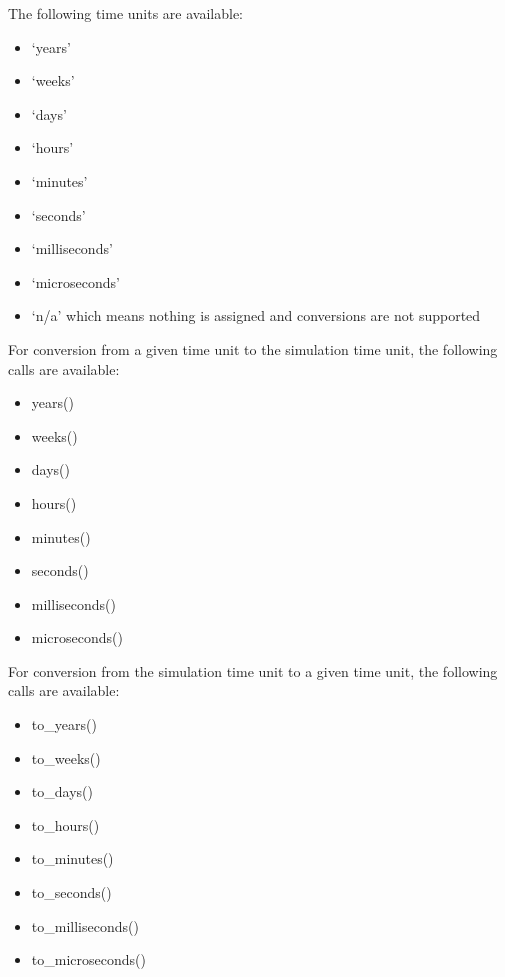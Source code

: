 \documentclass[letterpaper,10pt,english]{sphinxmanual}
\begin{document}
The following time units are available:
\begin{itemize}
\item {} 
‘years’

\item {} 
‘weeks’

\item {} 
‘days’

\item {} 
‘hours’

\item {} 
‘minutes’

\item {} 
‘seconds’

\item {} 
‘milliseconds’

\item {} 
‘microseconds’

\item {} 
‘n/a’ which means nothing is assigned and conversions are not supported

\end{itemize}

For conversion from a given time unit to the simulation time unit, the following calls are available:
\begin{itemize}
\item {} 
years()

\item {} 
weeks()

\item {} 
days()

\item {} 
hours()

\item {} 
minutes()

\item {} 
seconds()

\item {} 
milliseconds()

\item {} 
microseconds()

\end{itemize}

For conversion from the simulation time unit to a given time unit, the following calls are available:
\begin{itemize}
\item {} 
to\_years()

\item {} 
to\_weeks()

\item {} 
to\_days()

\item {} 
to\_hours()

\item {} 
to\_minutes()

\item {} 
to\_seconds()

\item {} 
to\_milliseconds()

\item {} 
to\_microseconds()

\end{itemize}
\end{document}
